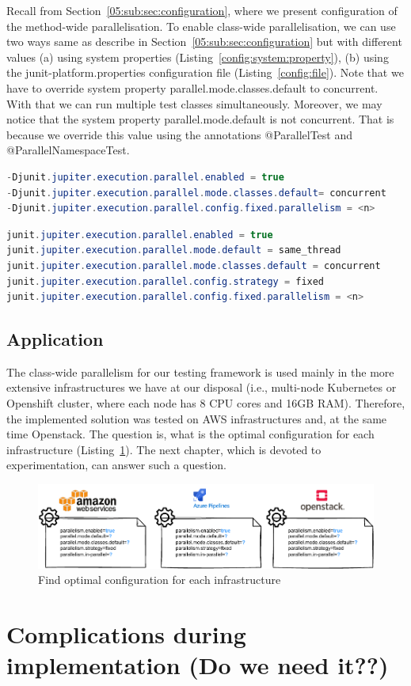 Recall from Section~\ref{05:sub:sec:configuration}, where we present configuration of the method-wide parallelisation.
To enable class-wide parallelisation, we can use two ways same as describe in Section~\ref{05:sub:sec:configuration} but
with different values (a) using system properties (Listing~\ref{config:system:property}),
(b) using the junit-platform.properties configuration file (Listing~\ref{config:file}).
Note that we have to override system property parallel.mode.classes.default to concurrent.
With that we can run multiple test classes simultaneously.
Moreover, we may notice that the system property parallel.mode.default is not concurrent.
That is because we override this value using the annotations @ParallelTest and @ParallelNamespaceTest.
\begin{lstlisting}[language= Java,label=config:system:property,caption=(a) Configuration via system properties,frame=tb]
-Djunit.jupiter.execution.parallel.enabled = true
-Djunit.jupiter.execution.parallel.mode.classes.default= concurrent
-Djunit.jupiter.execution.parallel.config.fixed.parallelism = <n>
\end{lstlisting}
\begin{lstlisting}[language=Java,label=config:file,caption=(b) Configuration via file,frame = tb]
junit.jupiter.execution.parallel.enabled = true
junit.jupiter.execution.parallel.mode.default = same_thread
junit.jupiter.execution.parallel.mode.classes.default = concurrent
junit.jupiter.execution.parallel.config.strategy = fixed
junit.jupiter.execution.parallel.config.fixed.parallelism = <n>
\end{lstlisting}

\subsection{Application}
\label{05:class:wide:application}

The class-wide parallelism for our testing framework is used mainly in the more extensive infrastructures we have at our disposal
(i.e., multi-node Kubernetes or Openshift cluster, where each node has 8 CPU cores and 16GB RAM).
Therefore, the implemented solution was tested on AWS infrastructures and, at the same time Openstack.
The question is, what is the optimal configuration for each infrastructure (Listing~\ref{07:fig:optimal:configuration:infrastructure}).
The next chapter, which is devoted to experimentation, can answer such a question.

\begin{figure}[!ht]
\centering
\includegraphics[scale=0.9]{obrazky-figures/07-implementation/01-configuration}
\caption{Find optimal configuration for each infrastructure}
\label{07:fig:optimal:configuration:infrastructure}
\end{figure}

\section{Complications during implementation (Do we need it??)}
